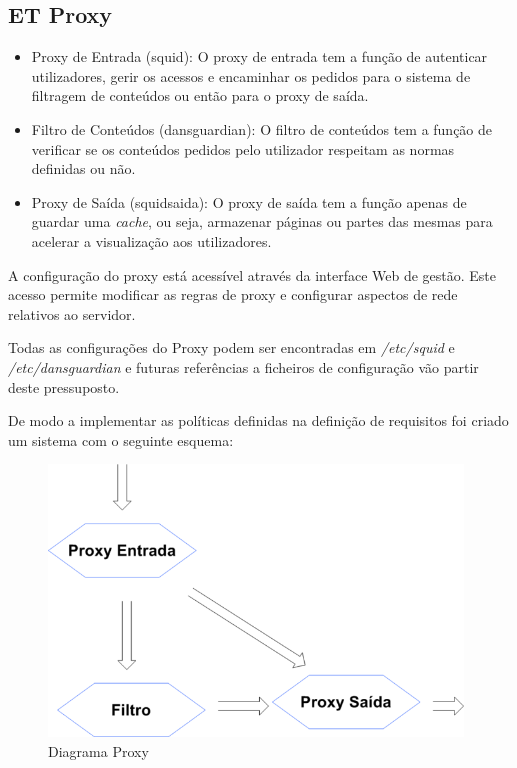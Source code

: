 \subsection{ET Proxy}
\begin{itemize}
	\item Proxy de Entrada (squid): O proxy de entrada tem a função de autenticar utilizadores, gerir os acessos e encaminhar os pedidos para o sistema de filtragem de conteúdos ou então para o proxy de saída.
	\item Filtro de Conteúdos (dansguardian): O filtro de conteúdos tem a função de verificar se os conteúdos pedidos pelo utilizador respeitam as normas definidas ou não.
	\item Proxy de Saída (squidsaida): O proxy de saída tem a função apenas de guardar uma \emph{cache}, ou seja, armazenar páginas ou partes das mesmas para acelerar a visualização aos utilizadores.
\end{itemize}

A configuração do proxy está acessível através da interface Web de gestão.
Este acesso permite modificar as regras de proxy e configurar aspectos de rede relativos ao servidor.

Todas as configurações do Proxy podem ser encontradas em \emph{/etc/squid} e \emph{/etc/dansguardian} e futuras referências a ficheiros de configuração vão partir deste pressuposto.

De modo a implementar as políticas definidas na definição de requisitos foi criado um sistema com o seguinte esquema:

\begin{figure}[H]
        \begin{center}
                \includegraphics[width=11cm]{include/img/squid+dansguardian+squidsaida}
        \end{center}
        \caption{Diagrama Proxy}
        \label{fig:proxy}
\end{figure}

